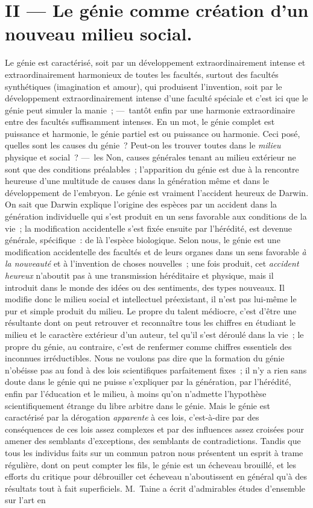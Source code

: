 \documentclass[french,twoside]{book} %
\begin{document}
\section[{II — Le génie comme création d’un nouveau milieu social.}]{II — Le génie comme création d’un nouveau milieu social.}
\noindent Le génie est caractérisé, soit par un développement extraordinairement intense et extraordinairement harmonieux de toutes les facultés, surtout des facultés synthétiques (imagination et amour), qui produisent l’invention, soit par le développement extraordinairement intense d’une faculté spéciale et c’est ici que le génie peut simuler la manie ; — tantôt enfin par une harmonie extraordinaire entre des facultés suffisamment intenses. En un mot, le génie complet est puissance et harmonie, le génie partiel est ou puissance ou harmonie. Ceci posé, quelles sont les causes du génie ? Peut-on les trouver toutes dans le \emph{milieu} physique et social ? — les Non, causes générales tenant au milieu extérieur ne sont que des conditions préalables ; l’apparition du génie est due à la rencontre heureuse d’une multitude de causes dans la génération même et dans le développement de l’embryon. Le génie est vraiment l’accident heureux de Darwin. On sait que Darwin explique l’origine des espèces par un accident dans la génération individuelle qui s’est produit en un sens favorable aux conditions de la vie ; la modification accidentelle s’est fixée ensuite par l’hérédité, est devenue générale, spécifique : de là l’espèce biologique. Selon nous, le génie est une modification accidentelle des facultés et de leurs organes dans un sens favorable \emph{à la nouveauté} et à l’invention de choses nouvelles ; une fois produit, cet \emph{accident heureux} n’aboutit pas à une transmission héréditaire et physique, mais il introduit dans le monde des idées ou des sentiments, des types nouveaux. Il modifie donc le milieu social et intellectuel préexistant, il n’est pas lui-même le pur et simple produit du milieu. Le propre du talent médiocre, c’est d’être une résultante dont on peut retrouver et reconnaître tous les chiffres en étudiant le milieu et le caractère extérieur d’un auteur, tel qu’il s’est déroulé dans la vie ; le propre du génie, au contraire, c’est de renfermer comme chiffres essentiels des inconnues irréductibles. Nous ne voulons pas dire que la formation du génie n’obéisse pas au fond à des lois scientifiques parfaitement fixes ; il n’y a rien sans doute dans le génie qui ne puisse s’expliquer par la génération, par l’hérédité, enfin par l’éducation et le milieu, à moins qu’on n’admette l’hypothèse scientifiquement étrange du libre arbitre dans le génie. Mais le génie est caractérisé par la dérogation \emph{apparente} à ces lois, c’est-à-dire par des conséquences de ces lois assez complexes et par des influences assez croisées pour amener des semblants d’exceptions, des semblants de contradictions. Tandis que tous les individus faits sur un commun patron nous présentent un esprit à trame régulière, dont on peut compter les fils, le génie est un écheveau brouillé, et les efforts du critique pour débrouiller cet écheveau n’aboutissent en général qu’à des résultats tout à fait superficiels. M. Taine a écrit d’admirables études d’ensemble sur l’art en 
\end{document}
